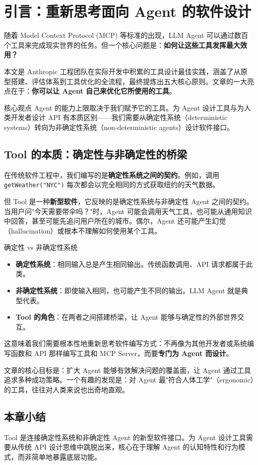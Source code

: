 \section{引言：重新思考面向 Agent 的软件设计}

随着 Model Context Protocol (MCP) 等标准的出现，LLM Agent 可以通过数百个工具来完成现实世界的任务。但一个核心问题是：\textbf{如何让这些工具发挥最大效用？}

本文是 Anthropic 工程团队在实际开发中积累的工具设计最佳实践，涵盖了从原型搭建、评估体系到工具优化的全流程，最终提炼出五大核心原则。文章的一大亮点在于：\textbf{你可以让 Agent 自己来优化它所使用的工具}。

\begin{importantbox}{核心观点}
Agent 的能力上限取决于我们赋予它的工具。为 Agent 设计工具与为人类开发者设计 API 有本质区别——我们需要从确定性系统（deterministic systems）转向为非确定性系统（non-deterministic agents）设计软件接口。
\end{importantbox}

\subsection{Tool 的本质：确定性与非确定性的桥梁}

在传统软件工程中，我们编写的是\textbf{确定性系统之间的契约}。例如，调用 \texttt{getWeather("NYC")} 每次都会以完全相同的方式获取纽约的天气数据。

但 Tool 是一种\textbf{新型软件}，它反映的是确定性系统与非确定性 Agent 之间的契约。当用户问"今天需要带伞吗？"时，Agent 可能会调用天气工具，也可能从通用知识中回答，甚至可能先追问用户所在的城市。偶尔，Agent 还可能产生幻觉（hallucination）或根本不理解如何使用某个工具。

\begin{knowledgebox}{确定性 vs 非确定性系统}
\begin{itemize}[leftmargin=1.5em]
    \item \textbf{确定性系统}：相同输入总是产生相同输出。传统函数调用、API 请求都属于此类。
    \item \textbf{非确定性系统}：即使输入相同，也可能产生不同的输出。LLM Agent 就是典型代表。
    \item \textbf{Tool 的角色}：在两者之间搭建桥梁，让 Agent 能够与确定性的外部世界交互。
\end{itemize}
\end{knowledgebox}

这意味着我们需要根本性地重新思考软件编写方式：不再像为其他开发者或系统编写函数和 API 那样编写工具和 MCP Server，而要\textbf{专门为 Agent 而设计}。

文章的核心目标是：扩大 Agent 能够有效解决问题的覆盖面，让 Agent 通过工具追求多种成功策略。一个有趣的发现是：对 Agent 最"符合人体工学"（ergonomic）的工具，往往对人类来说也出奇地直观。

\subsection{本章小结}

Tool 是连接确定性系统和非确定性 Agent 的新型软件接口。为 Agent 设计工具需要从传统 API 设计思维中跳脱出来，核心在于理解 Agent 的认知特性和行为模式，而非简单地暴露底层功能。


